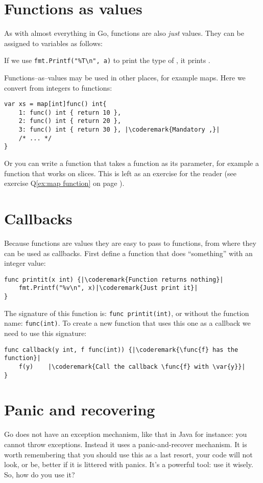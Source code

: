 \section{Functions as values}
\label{sec:functions as values}
As with almost everything in Go, functions are also \emph{just} values.
They can be assigned to variables as follows:

If we use \lstinline{fmt.Printf("%T\n", a)} to print the type of
, it prints .

Functions--as--values may be used in other places, for example maps.
Here we convert from integers to functions:
\begin{lstlisting}[caption=Functions as values in maps]
var xs = map[int]func() int{
    1: func() int { return 10 },
    2: func() int { return 20 },
    3: func() int { return 30 }, |\coderemark{Mandatory ,}|
    /* ... */
}
\end{lstlisting}
Or you can write a function that takes a function as its parameter, for
example a  function that works on  slices. This is
left as an exercise for the reader (see exercise Q\ref{ex:map function}
on page \pageref{ex:map function}).

\section{Callbacks}
\label{sec:callbacks}
Because functions are values they are easy to pass to functions, from where
they can be used as callbacks. First define a function that
does ``something'' with an integer value:
\begin{lstlisting}
func printit(x int) {|\coderemark{Function returns nothing}|
    fmt.Printf("%v\n", x)|\coderemark{Just print it}|
}
\end{lstlisting}
The signature of this function is: \lstinline{func printit(int)}, or
without the function name: \mbox{\lstinline{func(int)}}. To create a new function
that uses this one as a callback we need to use this signature:
\begin{lstlisting}
func callback(y int, f func(int)) {|\coderemark{\func{f} has the function}|
    f(y)    |\coderemark{Call the callback \func{f} with \var{y}}|
}
\end{lstlisting}

\section{Panic and recovering}
\label{sec:panic}
Go does not have an exception mechanism, like that in Java for instance: you cannot throw exceptions.
Instead it uses a panic-and-recover mechanism. It is worth remembering that you should use this as
a last resort, your code will not look, or be, better if it is littered with panics. It's a powerful tool:
use it wisely. So, how do you use it?

